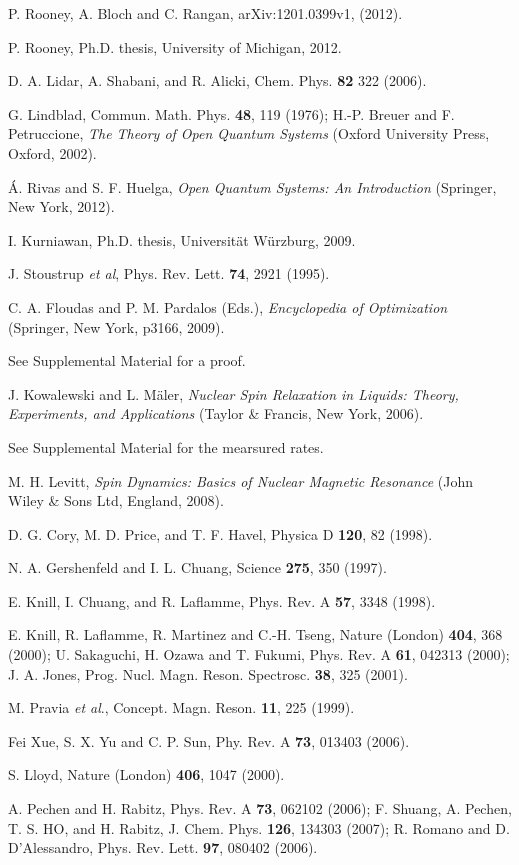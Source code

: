 \documentclass[prl,aps,twocolumn, reprint, amsmath,amssymb,showpacs,superscriptaddress]{revtex4}
\begin{document}
\begin{thebibliography}{28}
 P. Rooney, A. Bloch and C. Rangan, arXiv:1201.0399v1, (2012).


 P. Rooney, Ph.D. thesis, University of Michigan, 2012.

 D. A. Lidar, A. Shabani, and R. Alicki, Chem. Phys. \textbf{82} 322 (2006).

 G. Lindblad, Commun. Math. Phys. \textbf{48}, 119 (1976); H.-P. Breuer and F. Petruccione, \emph{The Theory of Open Quantum Systems} (Oxford University Press, Oxford, 2002).

 \'{A}. Rivas and S. F. Huelga, \emph{Open Quantum Systems: An Introduction} (Springer, New York, 2012).

 I. Kurniawan, Ph.D. thesis, Universit{\"{a}}t W{\"{u}}rzburg, 2009.

 J. Stoustrup \emph{et al}, Phys. Rev. Lett. \textbf{74}, 2921 (1995).

  C. A. Floudas and P. M. Pardalos (Eds.), \emph{Encyclopedia of Optimization} (Springer, New York, p3166, 2009).

 See Supplemental Material for a proof.

 J. Kowalewski and L. M{\"{a}}ler, \emph{Nuclear Spin Relaxation in Liquids: Theory, Experiments, and Applications} (Taylor \& Francis, New York, 2006).

 See Supplemental Material for the mearsured rates.


 M. H. Levitt, \emph{Spin Dynamics: Basics of Nuclear Magnetic Resonance} (John Wiley \& Sons Ltd, England, 2008).



 D. G. Cory, M. D. Price, and T. F. Havel, Physica D \textbf{120}, 82 (1998).

 N. A. Gershenfeld and I. L. Chuang, Science \textbf{275}, 350 (1997).

 E. Knill, I. Chuang, and R. Laflamme, Phys. Rev. A \textbf{57}, 3348 (1998).

 E. Knill, R. Laflamme, R. Martinez and C.-H. Tseng, Nature (London) \textbf{404}, 368 (2000); U. Sakaguchi, H. Ozawa and T. Fukumi, Phys. Rev. A \textbf{61}, 042313 (2000); J. A. Jones, Prog. Nucl. Magn. Reson. Spectrosc. \textbf{38}, 325 (2001).

 M. Pravia \emph{et al}., Concept. Magn. Reson. \textbf{11}, 225 (1999).

 Fei Xue, S. X. Yu and C. P. Sun, Phy. Rev. A \textbf{73}, 013403 (2006).

 S. Lloyd, Nature (London) \textbf{406}, 1047 (2000).

 A. Pechen and H. Rabitz, Phys. Rev. A \textbf{73}, 062102 (2006); F. Shuang, A. Pechen, T. S. HO, and H. Rabitz, J. Chem. Phys. \textbf{126}, 134303 (2007); R. Romano and D. D'Alessandro, Phys. Rev. Lett. \textbf{97}, 080402 (2006).
\end{thebibliography}
\end{document}
